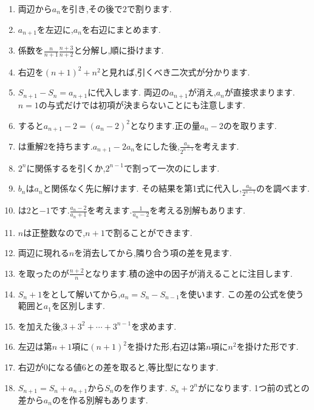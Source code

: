 \begin{enumerate}[label=\textbf{問\arabic*.},leftmargin=3.8em,format=\bookitemlink{practice-basic}{hint}{answer}]
  \item 両辺から$a_n$を引き,その後で$2$で割ります.
  \item $a_{n+1}$を左辺に,$a_n$を右辺にまとめます.
  \item 係数を$\frac{n}{n+1}\frac{n+3}{n+2}$と分解し,順に掛けます.
  \item 右辺を$(n+1)^2+n^2$と見れば,引くべき二次式が分かります.
  \item $S_{n+1}-S_n=a_{n+1}$に代入します. 両辺の$a_{n+1}$が消え,$a_n$が直接求まります. $n=1$の与式だけでは初項が決まらないことにも注意します.
  \item {}すると$a_{n+1}-2=(a_n-2)^2$となります.正の量$a_n-2$のを取ります.
  \item {}は重解$2$を持ちます.$a_{n+1}-2a_n$をにした後,$\frac{a_n}{2^{n-1}}$を考えます.
  \item $2^n$に関係するを引くか,$2^{n-1}$で割って一次のにします.
  \item $b_n$は$a_n$と関係なく先に解けます. その結果を第1式に代入し,$\frac{a_n}{2^{n-1}}$のを調べます.
  \item {}は$2$と$-1$です.$\frac{a_n-2}{a_n+1}$を考えます.$\frac{1}{a_n-2}$を考える別解もあります.
  \item $n$は正整数なので,$n+1$で割ることができます.
  \item 両辺に現れる$n$を消去してから,隣り合う項の差を見ます.
  \item {}を取ったのが$\frac{n+2}{n}$となります.積の途中の因子が消えることに注目します.
  \item $S_n+1$をとして解いてから,$a_n=S_n-S_{n-1}$を使います. この差の公式を使う範囲と$a_1$を区別します.
  \item {}を加えた後,$3+3^2+\cdots+3^{n-1}$を求めます.
  \item 左辺は第$n+1$項に$(n+1)^2$を掛けた形,右辺は第$n$項に$n^2$を掛けた形です.
  \item 右辺が$0$になる値$6$との差を取ると,等比型になります.
  \item $S_{n+1}=S_n+a_{n+1}$から$S_n$のを作ります. $S_n+2^n$がになります. 1つ前の式との差から$a_n$のを作る別解もあります.

\end{enumerate}
